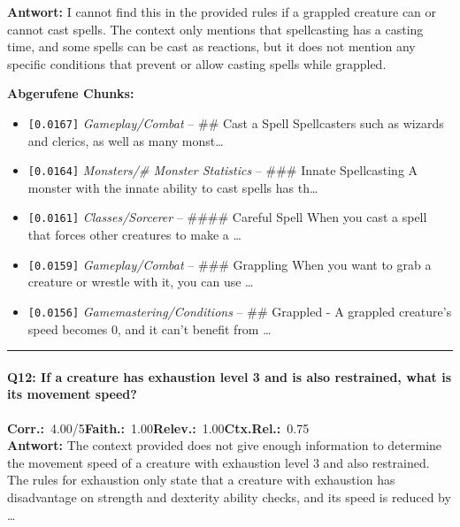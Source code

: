 \noindent\textbf{Antwort:} I cannot find this in the provided rules if a grappled creature can or cannot cast spells. The context only mentions that spellcasting has a casting time, and some spells can be cast as reactions, but it does not mention any specific conditions that prevent or allow casting spells while grappled.

\noindent\textbf{Abgerufene Chunks:}
\begin{itemize}[noitemsep, topsep=2pt]
  \item[\textbf{\#1}] \texttt{[0.0167]} \textit{Gameplay/Combat} -- \#\# Cast a Spell  Spellcasters such as wizards and clerics, as well as many monst\ldots
  \item[\textbf{\#2}] \texttt{[0.0164]} \textit{Monsters/# Monster Statistics} -- \#\#\# Innate Spellcasting  A monster with the innate ability to cast spells has th\ldots
  \item[\textbf{\#3}] \texttt{[0.0161]} \textit{Classes/Sorcerer} -- \#\#\#\# Careful Spell  When you cast a spell that forces other creatures to make a \ldots
  \item[\textbf{\#4}] \texttt{[0.0159]} \textit{Gameplay/Combat} -- \#\#\# Grappling  When you want to grab a creature or wrestle with it, you can use \ldots
  \item[\textbf{\#5}] \texttt{[0.0156]} \textit{Gamemastering/Conditions} -- \#\# Grappled  - A grappled creature's speed becomes 0, and it can't benefit from \ldots
\end{itemize}
\vspace{4pt}
\hrule
\vspace{6pt}

\paragraph{Q12: If a creature has exhaustion level 3 and is also restrained, what is its movement speed?}
\noindent \textbf{Corr.:}~4.00/5\quad \textbf{Faith.:}~1.00\quad \textbf{Relev.:}~1.00\quad \textbf{Ctx.Rel.:}~0.75\\

\noindent\textbf{Antwort:} The context provided does not give enough information to determine the movement speed of a creature with exhaustion level 3 and also restrained. The rules for exhaustion only state that a creature with exhaustion has disadvantage on strength and dexterity ability checks, and its speed is reduced by \ldots

